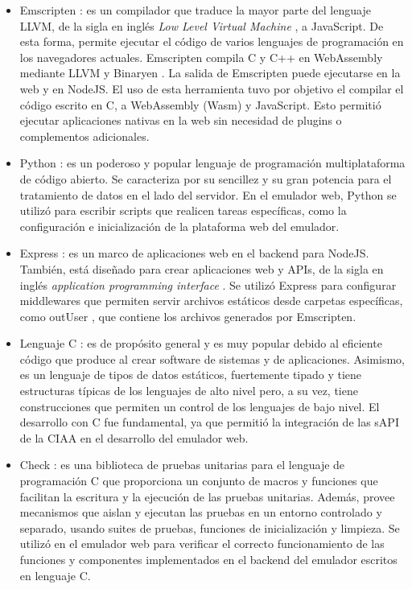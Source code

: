 \begin{itemize}
	\item Emscripten \citep{Emscripten}: es un compilador que traduce la mayor parte del lenguaje LLVM, de la sigla en inglés \textit{Low Level Virtual Machine} \citep{LLVM}, a JavaScript. De esta forma, permite ejecutar el código de varios lenguajes de programación en los navegadores actuales.
Emscripten compila C y C++ en WebAssembly \citep{WebAssembly} mediante LLVM y Binaryen \citep{Binaryen}. La salida de Emscripten puede ejecutarse en la web y en NodeJS.
El uso de esta herramienta tuvo por objetivo el compilar el código escrito en C, a WebAssembly (Wasm) y JavaScript.	Esto permitió ejecutar aplicaciones nativas en la web sin necesidad de plugins o complementos adicionales.

	\item Python \citep{Python}:  es un poderoso y popular lenguaje de programación multiplataforma de código abierto. Se caracteriza por su sencillez y su gran potencia para el tratamiento de datos en el lado del servidor. En el emulador web, Python se utilizó para escribir scripts que realicen tareas específicas, como la configuración e inicialización de la plataforma web del emulador.
    
    \item Express \citep{Express}: es un marco de aplicaciones web en el backend para NodeJS. También, está diseñado para crear aplicaciones web y APIs, de la sigla en inglés \textit{application programming interface} \citep{API}. Se utilizó Express para configurar middlewares que permiten servir archivos estáticos desde carpetas específicas, como \textquotedbl outUser \textquotedbl, que contiene los archivos generados por Emscripten.
    
    \item Lenguaje C \citep{LenguajeC}: es de propósito general y es muy popular debido al eficiente código que produce al crear software de sistemas y de aplicaciones. 
    Asimismo, es un lenguaje de tipos de datos estáticos, fuertemente tipado y tiene estructuras típicas de los lenguajes de alto nivel pero, a su vez, tiene construcciones que permiten un control de los lenguajes de bajo nivel. El desarrollo con C fue fundamental, ya que permitió la integración de las sAPI de la CIAA en el desarrollo del emulador web.
        
    \item Check \citep{Check}: es una biblioteca de pruebas unitarias para el lenguaje de programación C que proporciona un conjunto de macros y funciones que facilitan la escritura y la ejecución de las pruebas unitarias. Además, provee mecanismos que aislan y ejecutan las pruebas en un entorno controlado y separado, usando suites de pruebas, funciones de inicialización y limpieza. Se utilizó en el emulador web para verificar el correcto funcionamiento de las funciones y componentes implementados en el backend del emulador escritos en lenguaje C.
    

\end{itemize}
